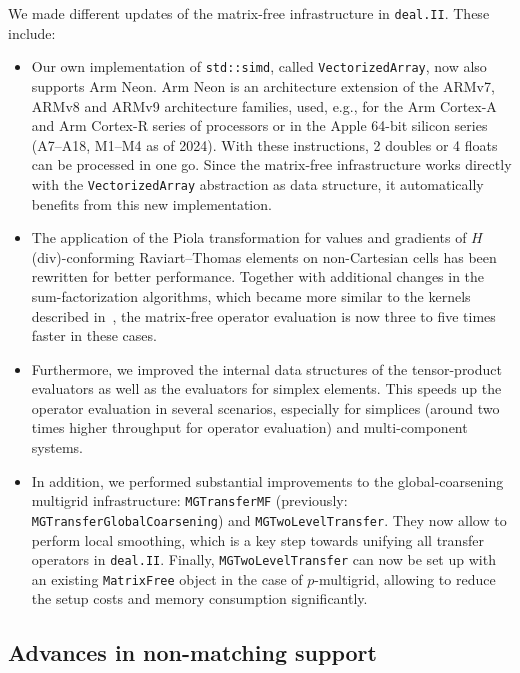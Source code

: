 \documentclass{ansarticle-preprint}
\newcommand{\specialword}[1]{\texttt{#1}}
\newcommand{\dealii}{{\specialword{deal.II}}\xspace}
\begin{document}
We made different updates of the matrix-free infrastructure in \dealii. These include:
\begin{itemize}
\item Our own implementation of \texttt{std::simd}, called
  \texttt{VectorizedArray}, now also supports Arm Neon. Arm Neon is an
  architecture extension of the ARMv7, ARMv8 and ARMv9 architecture families,
  used, e.g., for the Arm Cortex-A and Arm Cortex-R series of processors or in
  the Apple 64-bit silicon series (A7--A18, M1--M4 as of 2024).
  With these instructions, 2 doubles or 4 floats can be processed in one
  go. Since the matrix-free infrastructure works directly with the \texttt{VectorizedArray}
  abstraction as data structure, it automatically benefits from this new implementation.

\item The application of the Piola transformation for values and gradients of
  $H$(div)-conforming Raviart--Thomas elements on non-Cartesian cells has
  been rewritten for better performance. Together with additional changes in
  the sum-factorization algorithms, which became more similar to the kernels
  described in~\cite{KronbichlerKormann2019}, the matrix-free operator
  evaluation is now three to five times faster in these cases.

\item Furthermore, we improved the internal data structures of the tensor-product
  evaluators as well as the evaluators for simplex elements.  This speeds up
  the operator evaluation in several scenarios, especially for simplices
  (around two times higher throughput for operator evaluation) and
  multi-component systems.

\item In addition, we performed substantial improvements to the global-coarsening
  multigrid infrastructure: \texttt{MGTransferMF} (previously:
  \texttt{MGTransferGlobalCoarsening}) and \texttt{MGTwoLevel\-Transfer}. They
  now allow to perform local smoothing, which is a key step towards unifying
  all transfer operators in \dealii. Finally, \texttt{MGTwoLevelTransfer} can now
  be set up with an existing \texttt{MatrixFree} object in the case
  of $p$-multigrid, allowing to reduce the setup costs and memory consumption significantly.
\end{itemize}


\subsection{Advances in non-matching support}\label{sec:nonmatching}
\end{document}
